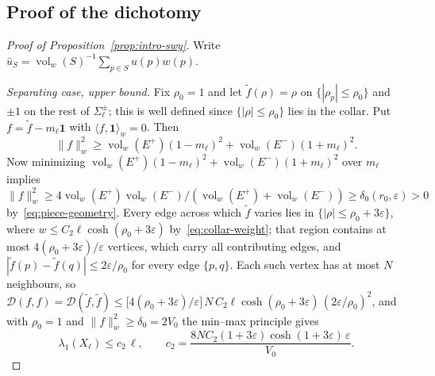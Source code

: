 \documentclass[10pt,reqno]{amsart}
\theoremstyle{remark}
\newcommand{\vol}{\operatorname{vol}}
\newcommand{\normw}[1]{\lVert #1 \rVert_{w}}
\newcommand{\DD}{\mathcal{D}}
\begin{document}
\subsection*{Proof of the dichotomy}

\begin{proof}[Proof of Proposition~\ref{prop:intro-swy}]
Write $\bar u_S=\vol_w(S)^{-1}\sum_{p\in S}u(p)w(p)$.

\emph{Separating case, upper bound.} Fix $\rho_0=1$ and let
$\tilde f(\rho)=\rho$ on $\{|\rho_p|\le\rho_0\}$ and $\pm1$ on the
rest of $\Sigma^\pm_\ell$; this is well defined since
$\{|\rho|\le\rho_0\}$ lies in the collar. Put
$f=\tilde f-m_\ell\mathbf1$ with $\langle f,\mathbf1\rangle_w=0$. Then
\[\normw{f}^2 \geq  \vol_w(E^+)(1-m_\ell)^2+\vol_w(E^-)(1+m_\ell)^2.\]
Now minimizing $\vol_w(E^+)(1-m_\ell)^2+\vol_w(E^-)(1+m_\ell)^2$ over $m_\ell$ implies
$\normw{f}^2\ge4\vol_w(E^+)\vol_w(E^-)/(\vol_w(E^+)+\vol_w(E^-))
\ge\delta_0(r_0,\varepsilon)>0$ by~\eqref{eq:piece-geometry}. Every edge
across which $\tilde f$ varies lies in
$\{|\rho|\le\rho_0+3\varepsilon\}$, where
$w\le C_2\ell\cosh(\rho_0+3\varepsilon)$
by~\eqref{eq:collar-weight}; that region contains at most
$4(\rho_0+3\varepsilon)/\varepsilon$ vertices, which carry all
contributing edges,
and $|\tilde f(p)-\tilde f(q)|\le2\varepsilon/\rho_0$ for every edge $\{p,q\}$. Each such vertex has at
most $N$ neighbours, so
$\DD(f,f)=\DD(\tilde f,\tilde f)\le
\bigl[4(\rho_0+3\varepsilon)/\varepsilon\bigr]\,N\,
C_2\ell\cosh(\rho_0+3\varepsilon)\,(2\varepsilon/\rho_0)^2$, and with
$\rho_0=1$ and $\normw{f}^2\ge\delta_0=2V_0$ the min--max principle
gives
\begin{equation}
\label{eq:c2}
  \lambda_1(X_\ell)\le c_2\,\ell,
  \qquad
  c_2=\frac{8NC_2(1+3\varepsilon)\cosh(1+3\varepsilon)\,\varepsilon}{V_0}.
\end{equation}


\end{proof}
\end{document}
